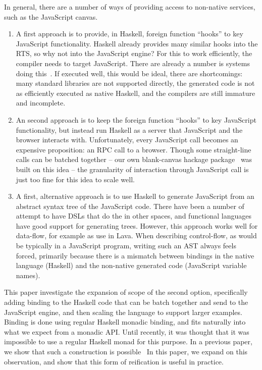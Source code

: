 \documentclass{llncs}
\begin{document}
In general, there are a number of ways of providing access to non-native services,
such as the JavaScript canvas.
\begin{enumerate}
\item A first approach is to provide, in Haskell, 
foreign function ``hooks'' to key JavaScript functionality.
Haskell already provides many similar hooks into the RTS,
so why not into the JavaScript engine?
For this to work efficiently, the compiler
needs to target JavaScript. There are already a
number is systems doing this~\cite{...}.
If executed well, this would be ideal,
there are shortcomings: many standard libraries
are not supported directly, the generated
code is not as efficiently executed as native Haskell,
and the compilers are still immature and incomplete.

\item An second approach is to keep the 
foreign function ``hooks'' to key JavaScript functionality,
but instead run Haskell as a server that JavaScript
and the browser interacts with.
Unfortunately, every JavaScript call becomes an expensive proposition: an RPC call
to a browser.
Though some straight-line calls can be batched together --
our own blank-canvas hackage package~\cite{..} was built on this idea --
the granularity of interaction through JavaScript call is just too fine for
this idea to scale well.

\item A first, alternative approach is to use Haskell to generate JavaScript from
an abstract syntax tree of the JavaScript code. There have
been a number of attempt to have DSLs that do the in other spaces,
and functional languages have good support for generating trees.
However, this approach works well for data-flow, for example
as use in Lava. When describing control-flow,
as would be typically in a JavaScript program,  writing such an AST always
feels forced, primarily because there is a mismatch between
bindings in the native language (Haskell) and the non-native
generated code (JavaScript variable names).

\end{enumerate}

This paper investigate the expansion of scope of the second option,
specifically adding binding to the Haskell code
that can be batch together and send to the JavaScript engine,
and then scaling the language to support larger examples.
Binding is done using regular Haskell monadic binding, and fits naturally
into what we expect from a monadic API. Until recently,
it was thought that it was impossible to use a regular
Haskell monad for this purpose. In a previous paper,
we show that such a construction is possible~\cite{..}
In this paper, we expand on this observation,
and show that this form of reification is useful in practice.
\end{document}
